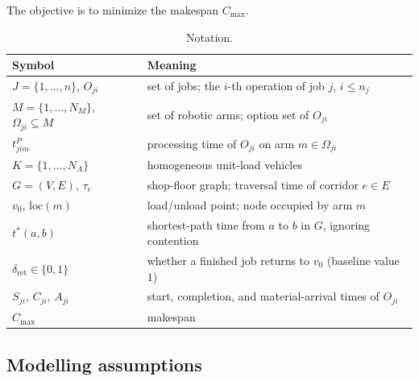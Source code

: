 \documentclass[manuscript,screen,review]{acmart}
\begin{document}
The objective is to minimize the makespan $C_{\max}$.

\begin{table}[t]
\caption{Notation.}
\label{tab:notation}
\small
\begin{tabular}{@{}ll@{}}
\toprule
Symbol & Meaning \\
\midrule
$J=\{1,\dots,n\}$, $O_{ji}$ & set of jobs; the $i$-th operation of job $j$, $i\le n_j$ \\
$M=\{1,\dots,N_M\}$, $\Omega_{ji}\subseteq M$ & set of robotic arms; option set of $O_{ji}$ \\
$t^P_{jim}$ & processing time of $O_{ji}$ on arm $m\in\Omega_{ji}$ \\
$K=\{1,\dots,N_A\}$ & homogeneous unit-load vehicles \\
$G=(V,E)$, $\tau_e$ & shop-floor graph; traversal time of corridor $e\in E$ \\
$v_0$, $\mathrm{loc}(m)$ & load/unload point; node occupied by arm $m$ \\
$t^{*}(a,b)$ & shortest-path time from $a$ to $b$ in $G$, ignoring contention \\
$\delta_{\mathrm{ret}}\in\{0,1\}$ & whether a finished job returns to $v_0$ (baseline value $1$) \\
$S_{ji}$, $C_{ji}$, $A_{ji}$ & start, completion, and material-arrival times of $O_{ji}$ \\
$C_{\max}$ & makespan \\
\bottomrule
\end{tabular}
\end{table}

\subsection{Modelling assumptions}
\label{sec:assumptions}
\end{document}
